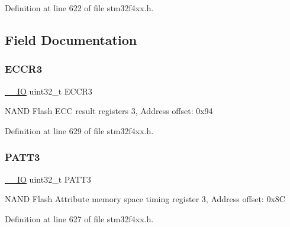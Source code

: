 Definition at line 622 of file stm32f4xx.\+h.



\subsection{Field Documentation}
\mbox{\label{struct_f_s_m_c___bank3___type_def_a6062be7dc144c07e01c303cb49d69ce2}} 
\subsubsection{\texorpdfstring{E\+C\+C\+R3}{ECCR3}}
{\footnotesize\ttfamily \hyperlink{group___c_m_s_i_s__core__definitions_gaec43007d9998a0a0e01faede4133d6be}{\+\_\+\+\_\+\+IO} uint32\+\_\+t E\+C\+C\+R3}

N\+A\+ND Flash E\+CC result registers 3, Address offset\+: 0x94 

Definition at line 629 of file stm32f4xx.\+h.

\mbox{\label{struct_f_s_m_c___bank3___type_def_aba03fea9c1bb2242d963e29f1b94d25e}} 
\subsubsection{\texorpdfstring{P\+A\+T\+T3}{PATT3}}
{\footnotesize\ttfamily \hyperlink{group___c_m_s_i_s__core__definitions_gaec43007d9998a0a0e01faede4133d6be}{\+\_\+\+\_\+\+IO} uint32\+\_\+t P\+A\+T\+T3}

N\+A\+ND Flash Attribute memory space timing register 3, Address offset\+: 0x8C 

Definition at line 627 of file stm32f4xx.\+h.

\mbox{\label{struct_f_s_m_c___bank3___type_def_a73861fa74b83973fa1b5f92735c042ef}} 
